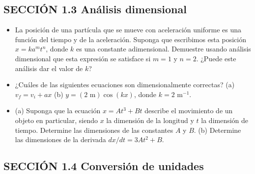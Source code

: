 \documentclass[11pt,a4paper]{article}
\begin{document}
\subsection*{SECCIÓN 1.3 Análisis dimensional}

\begin{itemize}
    \item[\textbf{8.}] La posición de una partícula que se mueve con aceleración uniforme es una función del tiempo y de la aceleración. Suponga que escribimos esta posición $x = k a^m t^n$, donde $k$ es una constante adimensional. Demuestre usando análisis dimensional que esta expresión se satisface si $m = 1$ y $n = 2$. ¿Puede este análisis dar el valor de $k$?
    \vspace*{6cm}
    
    \item[\textbf{9.}] ¿Cuáles de las siguientes ecuaciones son dimensionalmente correctas? (a) $v_f = v_i + ax$ (b) $y = (2 \text{ m}) \cos(kx)$, donde $k = 2 \text{ m}^{-1}$.
    \vspace*{6cm}
    
    \item[\textbf{10.}] (a) Suponga que la ecuación $x = At^3 + Bt$ describe el movimiento de un objeto en particular, siendo $x$ la dimensión de la longitud y $t$ la dimensión de tiempo. Determine las dimensiones de las constantes $A$ y $B$. (b) Determine las dimensiones de la derivada $dx/dt = 3At^2 + B$.
    \vspace*{6cm}
\end{itemize}

\newpage

\subsection*{SECCIÓN 1.4 Conversión de unidades}
\end{document}
